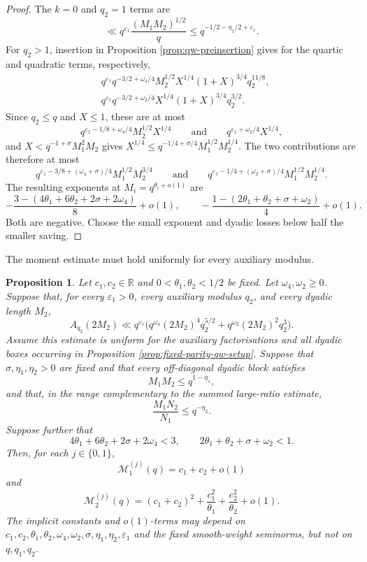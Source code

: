 \documentclass[12pt, a4paper]{amsart}
\numberwithin{equation}{section}
\newcommand{\R}{\mathbb{R}}
\renewcommand{\le}{\leqslant}
\renewcommand{\ge}{\geqslant}
\theoremstyle{plain}
\newtheorem{prop}[lem]{Proposition}
\begin{document}
\begin{proof}
The $k=0$ and $q_2=1$ terms are
$$
\ll q^{\varepsilon_1}\frac{(M_1M_2)^{1/2}}q\le q^{-1/2-\eta_1/2+\varepsilon_1}.
$$
 For $q_2>1$, insertion in Proposition \ref{prop:qw-preinsertion} gives for the quartic and quadratic terms, respectively,
$$
\begin{aligned}
&q^{\varepsilon_1}q^{-3/2+\omega_4/4}M_2^{1/2}X^{1/4}(1+X)^{3/4}q_2^{11/8},\\
&q^{\varepsilon_1}q^{-3/2+\omega_2/4}X^{1/4}(1+X)^{3/4}q_2^{3/2}.
\end{aligned}
$$
Since $q_2\le q$ and $X\le1$, these are at most
$$
q^{\varepsilon_1-1/8+\omega_4/4}M_2^{1/2}X^{1/4}\qquad\text{and}\qquad q^{\varepsilon_1+\omega_2/4}X^{1/4},
$$
and $X<q^{-1+\sigma}M_1^2M_2$ gives $X^{1/4}\le q^{-1/4+\sigma/4}M_1^{1/2}M_2^{1/4}$. The two contributions are therefore at most
$$
q^{\varepsilon_1-3/8+(\omega_4+\sigma)/4}M_1^{1/2}M_2^{3/4}
\qquad\text{and}\qquad
q^{\varepsilon_1-1/4+(\omega_2+\sigma)/4}M_1^{1/2}M_2^{1/4}.
$$
The resulting exponents at $M_i=q^{\theta_i+o(1)}$ are
$$
-\frac{3-(4\theta_1+6\theta_2+2\sigma+2\omega_4)}{8}+o(1),
\qquad
-\frac{1-(2\theta_1+\theta_2+\sigma+\omega_2)}{4}+o(1).
$$
Both are negative. Choose the small exponent and dyadic losses below half the smaller saving.
\end{proof}

The moment estimate must hold uniformly for every auxiliary modulus.

\begin{prop}\label{prop:qw-transfer}
Let $c_1,c_2\in\R$ and $0<\theta_1,\theta_2<1/2$ be fixed. Let $\omega_4,\omega_2\ge0$. Suppose that, for every $\varepsilon_1>0$, every auxiliary modulus $q_2$, and every dyadic length $M_2$,
$$
A_{q_2}(2M_2)
\ll
q^{\varepsilon_1}
\bigl(q^{\omega_4}(2M_2)^4q_2^{5/2}
+q^{\omega_2}(2M_2)^2q_2^3\bigr).
$$
Assume this estimate is uniform for the auxiliary factorisations and all dyadic boxes occurring in Proposition \ref{prop:fixed-parity-qw-setup}. Suppose that $\sigma,\eta_1,\eta_2>0$ are fixed and that every off-diagonal dyadic block satisfies
$$
M_1M_2\le q^{1-\eta_1},
$$
and that, in the range complementary to the summed large-ratio estimate,
$$
\frac{M_1N_2}{N_1}\le q^{-\eta_2}.
$$
Suppose further that
$$
4\theta_1+6\theta_2+2\sigma+2\omega_4<3,
\qquad
2\theta_1+\theta_2+\sigma+\omega_2<1.
$$
Then, for each $j\in\{0,1\}$,
$$
\mathcal M_1^{(j)}(q)=c_1+c_2+o(1)
$$
and
$$
\mathcal M_2^{(j)}(q)
=
(c_1+c_2)^2+\frac{c_1^2}{\theta_1}
+\frac{c_2^2}{\theta_2}+o(1).
$$
The implicit constants and $o(1)$-terms may depend on $c_1,c_2,\theta_1,\theta_2,\omega_4,\omega_2,\sigma,\eta_1,\eta_2,\varepsilon_1$ and the fixed smooth-weight seminorms, but not on $q,q_1,q_2$.
\end{prop}
\end{document}
